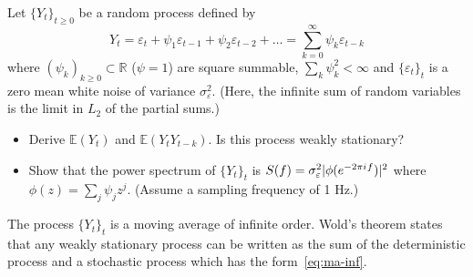 \documentclass[11pt]{article}
\begin{document}
\begin{exercise}[subtitle=Infinite order moving average MA($\infty$)]
Let $\{Y_t\}_{t\geq 0}$ be a random process defined by
\begin{equation}\label{eq:ma-inf}
    Y_t = \varepsilon_t + \psi_1 \varepsilon_{t-1} + \psi_2 \varepsilon_{t-2} + \dots = \sum_{k=0}^{\infty} \psi_k\varepsilon_{t-k}
\end{equation}
where $(\psi_k)_{k\geq0} \subset \mathbb{R}$ ($\psi=1$) are square summable, \ie $\sum_k \psi_k^2 < \infty$ and $\{\varepsilon_t\}_t$ is a zero mean white noise of variance $\sigma_\varepsilon^2$.
(Here, the infinite sum of random variables is the limit in $L_2$ of the partial sums.)
\begin{itemize}
    \item Derive $\mathbb{E}(Y_t)$ and $\mathbb{E}(Y_t Y_{t-k})$. Is this process weakly stationary?
    \item Show that the power spectrum of $\{Y_t\}_{t}$ is $S(f) = \sigma_\varepsilon^2 |\phi(e^{-2\pi{i\mkern1mu} f})|^2$ where $\phi(z) = \sum_j \psi_j z^j$. (Assume a sampling frequency of 1 Hz.)
\end{itemize}

The process $\{Y_t\}_{t}$ is a moving average of infinite order.
Wold's theorem states that any weakly stationary process can be written as the sum of the deterministic process and a stochastic process which has the form~\eqref{eq:ma-inf}.

\end{exercise}
\end{document}
